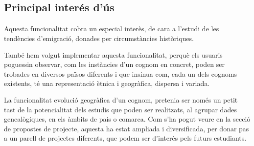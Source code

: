 \subsection{Principal interés d'ús}

\paragraph{}
Aquesta funcionalitat cobra un especial interès, de cara a l’estudi de les tendències d'emigració, donades per circumstàncies històriques.

També hem volgut implementar aquesta funcionalitat, perquè els usuaris pogue\-ssin observar, com les instàncies d'un cognom en concret, poden ser trobades en diversos països diferents i que insinua com, cada un dels cognoms existents, té una representació ètnica i geogràfica, dispersa i variada.

La funcionalitat evolució geogràfica d’un cognom, pretenia ser només un petit tast de la potencialitat dels estudis que poden ser realitzats, al agrupar dades genealògiques, en els àmbits de país o comarca. Com s’ha pogut veure en la secció de propostes de projecte, aquesta ha estat ampliada i diversificada, per donar pas a un parell de projectes diferents, que podem ser d'interès pels futurs estudiants.
